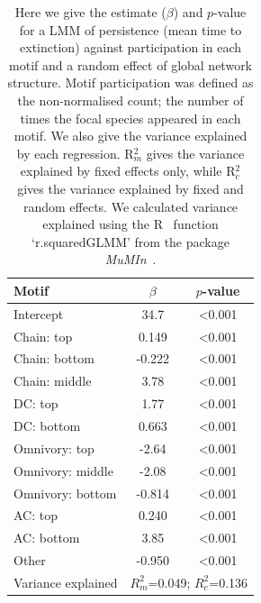 \documentclass[12pt]{article}
\begin{document}
\begin{spacing}{2.0}
		\begin{table}[h!]
    		\caption{Here we give the estimate ($\beta$) and $p$-value for a LMM of persistence (mean time to extinction) against participation in each motif and a random effect of global network structure. Motif participation was defined as the non-normalised count; the number of times the focal species appeared in each motif. We also give the variance explained by each regression. R$^{2}_{m}$ gives the variance explained by fixed effects only, while R$^{2}_{c}$ gives the variance explained by fixed and random effects. We calculated variance explained using the R~\citep{R} function `r.squaredGLMM' from the package \emph{MuMIn}~\citep{MuMIn}.}
    		\label{tab:Z_positions}
    		\begin{tabular}{l | c c}
    		Motif & $\beta$ & $p$-value \\  
    		\hline
            Intercept	&	34.7	&	\textless0.001	\\
            Chain: top	&	0.149	&	\textless0.001	\\
            Chain: bottom	&	-0.222	&	\textless0.001	\\
            Chain: middle	&	3.78	&	\textless0.001	\\
            DC: top	&	1.77	&	\textless0.001	\\
            DC: bottom	&	0.663	&	\textless0.001	\\
            Omnivory: top	&	-2.64	&	\textless0.001	\\
            Omnivory: middle	&	-2.08	&	\textless0.001	\\
            Omnivory: bottom	&	-0.814	&	\textless0.001	\\
            AC: top	&	0.240	&	\textless0.001	\\
            AC: bottom	&	3.85	&	\textless0.001	\\
            Other	&	-0.950	&	\textless0.001	\\
            \hline
    		Variance explained & \multicolumn{2}{c}{$R^{2}_m$=0.049; $R^2_c$=0.136} \\
    		\hline
    		\end{tabular}
    		\end{table}


\end{spacing}
\end{document}
